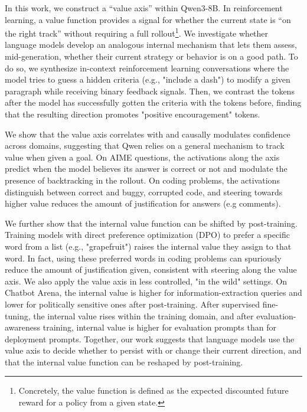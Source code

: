 \documentclass{article}
\begin{document}
In this work, we construct a ``value axis'' within Qwen3-8B. In reinforcement learning, a value function provides a signal for whether the current state is ``on the right track'' without requiring a full rollout\footnote{Concretely, the value function is defined as the expected discounted future reward for a policy from a given state.}. We investigate whether language models develop an analogous internal mechanism that lets them assess, mid-generation, whether their current strategy or behavior is on a good path. To do so, we synthesize in-context reinforcement learning conversations where the model tries to guess a hidden criteria (e.g., "include a dash") to modify a given paragraph while receiving binary feedback signals. Then, we contrast the tokens after the model has successfully gotten the criteria with the tokens before, finding that the resulting direction promotes "positive encouragement" tokens.

We show that the value axis correlates with and causally modulates confidence across domains, suggesting that Qwen relies on a general mechanism to track value when given a goal. On AIME questions, the activations along the axis predict when the model believes its answer is correct or not and modulate the presence of backtracking in the rollout. 
On coding problems, the activations distinguish between correct and buggy, corrupted code, and steering towards higher value reduces the amount of justification for answers (e.g comments). 

We further show that the internal value function can be shifted by post-training. Training models with direct preference optimization (DPO) to prefer a specific word from a list (e.g., "grapefruit") raises the internal value they assign to that word. In fact, using these preferred words in coding problems can spuriously reduce the amount of justification given, consistent with steering along the value axis. We also apply the value axis in less controlled, "in the wild" settings. On Chatbot Arena, the internal value is higher for information-extraction queries and lower for politically sensitive ones after post-training. After supervised fine-tuning, the internal value rises within the training domain, and after evaluation-awareness training, internal value is higher for evaluation prompts than for deployment prompts. Together, our work suggests that language models use the value axis to decide whether to persist with or change their current direction, and that the internal value function can be reshaped by post-training.
\end{document}
